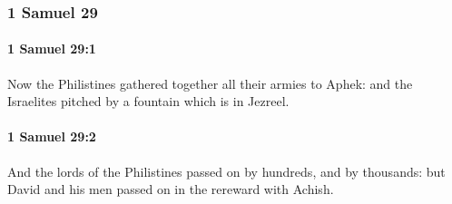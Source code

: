 	\subsubsection{1 Samuel 29} %
		\label{1SAMUEL-29}

		\paragraph{1 Samuel 29:1} %
			\label{1SAMUEL-29-1}

			Now the Philistines gathered together all their armies to Aphek: and the Israelites pitched by a fountain which is in Jezreel.


		\paragraph{1 Samuel 29:2} %
			\label{1SAMUEL-29-2}

			And the lords of the Philistines passed on by hundreds, and by thousands: but David and his men passed on in the rereward with Achish.


